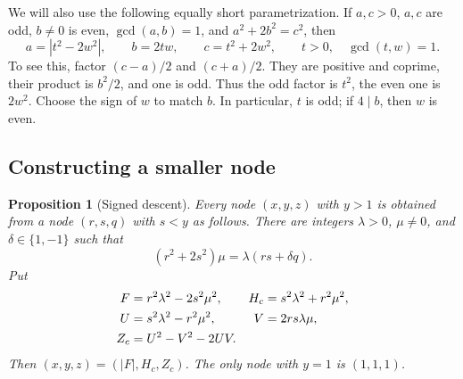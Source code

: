 \documentclass[11pt,a4paper]{article}
\newtheorem{proposition}[theorem]{Proposition}
\theoremstyle{definition}
\begin{document}
We will also use the following equally short parametrization. If
\(a,c>0\), \(a,c\) are odd, \(b\ne0\) is even,
\(\gcd(a,b)=1\), and \(a^2+2b^2=c^2\), then
\begin{equation}\label{eq:normtwo}
 a=|t^2-2w^2|,\qquad b=2tw,\qquad c=t^2+2w^2,
 \qquad t>0,\quad \gcd(t,w)=1.
\end{equation}
To see this, factor \((c-a)/2\) and \((c+a)/2\). They are positive
and coprime, their product is \(b^2/2\), and one is odd. Thus the
odd factor is \(t^2\), the even one is \(2w^2\). Choose the sign of
\(w\) to match \(b\). In particular, \(t\) is odd; if \(4\mid b\),
then \(w\) is even.

\subsection{Constructing a smaller node}

\begin{proposition}[Signed descent]\label{prop:descent}
Every node \((x,y,z)\) with \(y>1\) is obtained from a node
\((r,s,q)\) with \(s<y\) as follows. There are integers
\(\lambda>0\), \(\mu\ne0\), and \(\delta\in\{1,-1\}\) such that
\begin{equation}\label{eq:cell}
 (r^2+2s^2)\mu=\lambda(rs+\delta q).
\end{equation}
Put
\begin{align}\label{eq:ascent}
 F&=r^2\lambda^2-2s^2\mu^2,&
 H_c&=s^2\lambda^2+r^2\mu^2,\notag\\
 U&=s^2\lambda^2-r^2\mu^2,&
 V&=2rs\lambda\mu,\notag\\
 Z_c&=U^2-V^2-2UV.
\end{align}
Then \((x,y,z)=(|F|,H_c,Z_c)\). The only node with \(y=1\)
is \((1,1,1)\).
\end{proposition}
\end{document}
